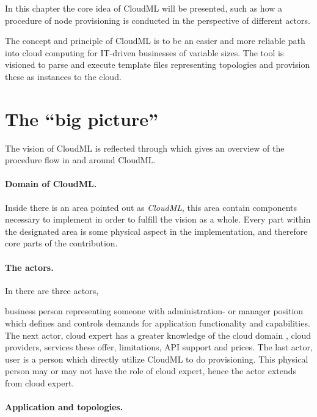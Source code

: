 

In this chapter the core idea of CloudML will be presented,
such as how a procedure of node provisioning is conducted in the 
perspective of different actors.

The concept and principle of CloudML is to be an easier and more reliable
path into cloud computing for IT-driven businesses of variable sizes.
The tool is visioned to parse and execute template files representing topologies
and provision these as instances to the cloud. 

\section{The ``big picture''}

The vision of CloudML is reflected through  which gives
an overview of the procedure flow in and around CloudML.

\paragraph{Domain of CloudML.}

Inside  there is an area pointed out as \emph{CloudML},
this area contain components necessary to implement in order to fulfill
the vision as a whole.
Every part within the designated area is some physical aspect in the 
implementation, and therefore core parts of the contribution.

\paragraph{The actors.}

In  there are three actors,
\begin{ii}
  \iitem business person representing someone with administration- or manager position which
    defines and controls demands for application functionality and capabilities.
    The next actor,
  \iitem cloud expert has a greater knowledge of the cloud domain \eg, cloud providers,
    services these offer, limitations, API support and prices.
    The last actor,
  \iitem user is a person which directly utilize CloudML to do provisioning.
    This physical person may or may not have the role of cloud expert, hence 
    the actor extends from cloud expert.
\end{ii}

\paragraph{Application and topologies.}

